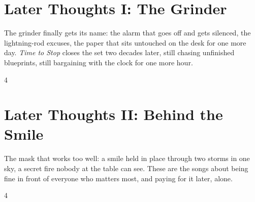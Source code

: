 \documentclass[a4paper,landscape]{memoir}
\begin{document}
\chapter{Later Thoughts I: The Grinder}
The grinder finally gets its name: the alarm that goes off and gets silenced, the lightning-rod excuses, the paper that sits untouched on the desk for one more day. \emph{Time to Stop} closes the set two decades later, still chasing unfinished blueprints, still bargaining with the clock for one more hour.
\clearpage\begin{multicols*}{4}













\end{multicols*}

\chapter{Later Thoughts II: Behind the Smile}
The mask that works too well: a smile held in place through two storms in one sky, a secret fire nobody at the table can see. These are the songs about being fine in front of everyone who matters most, and paying for it later, alone.
\clearpage\begin{multicols*}{4}






\end{multicols*}
\end{document}

